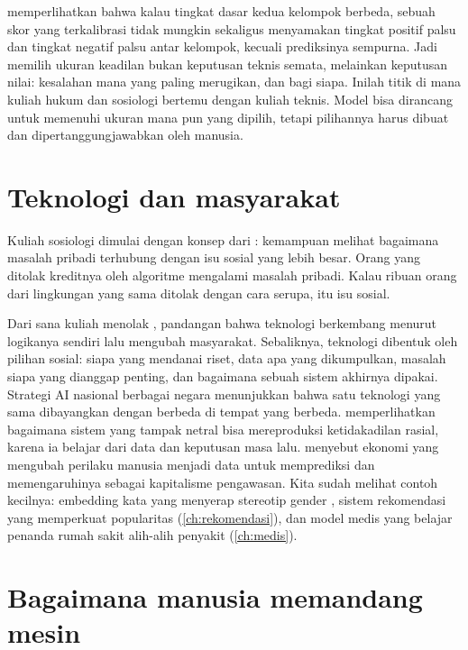 \citet{chouldechova2017} memperlihatkan bahwa kalau tingkat dasar kedua kelompok berbeda, sebuah skor yang terkalibrasi
tidak mungkin sekaligus menyamakan tingkat positif palsu dan tingkat negatif palsu antar kelompok, kecuali prediksinya
sempurna. Jadi memilih ukuran keadilan bukan keputusan teknis semata, melainkan keputusan nilai: kesalahan mana yang
paling merugikan, dan bagi siapa. Inilah titik di mana kuliah hukum dan sosiologi bertemu dengan kuliah teknis. Model
bisa dirancang untuk memenuhi ukuran mana pun yang dipilih, tetapi pilihannya harus dibuat dan dipertanggungjawabkan oleh
manusia.

\section{Teknologi dan masyarakat}

Kuliah sosiologi dimulai dengan konsep  dari \citet{mills1959}: kemampuan
melihat bagaimana masalah pribadi terhubung dengan isu sosial yang lebih besar. Orang yang ditolak
kreditnya oleh algoritme mengalami masalah pribadi. Kalau ribuan orang dari lingkungan yang sama ditolak
dengan cara serupa, itu isu sosial.

Dari sana kuliah menolak , pandangan bahwa teknologi berkembang menurut
logikanya sendiri lalu mengubah masyarakat. Sebaliknya, teknologi dibentuk oleh pilihan sosial: siapa yang
mendanai riset, data apa yang dikumpulkan, masalah siapa yang dianggap penting, dan bagaimana sebuah sistem
akhirnya dipakai. Strategi AI nasional berbagai negara menunjukkan bahwa satu teknologi yang sama
dibayangkan dengan berbeda di tempat yang berbeda. \citet{benjamin2019} memperlihatkan bagaimana
sistem yang tampak netral bisa mereproduksi ketidakadilan rasial, karena ia belajar dari data dan
keputusan masa lalu. \citet{zuboff2019} menyebut ekonomi yang mengubah perilaku manusia menjadi data untuk
memprediksi dan memengaruhinya sebagai kapitalisme pengawasan. Kita sudah melihat contoh kecilnya:
embedding kata yang menyerap stereotip gender \citep{bolukbasi2016}, sistem rekomendasi yang memperkuat
popularitas (\cref{ch:rekomendasi}), dan model medis yang belajar penanda rumah sakit alih-alih penyakit
(\cref{ch:medis}).

\section{Bagaimana manusia memandang mesin}

